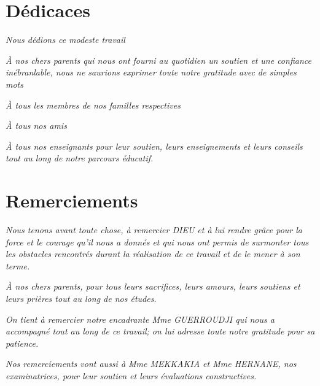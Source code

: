 \documentclass[12pt,a4paper,oneside]{report}
\begin{document}
\cleardoublepage
\thispagestyle{empty}\chapter*{Dédicaces}
\vspace*{3.5cm}
\begin{center}
\large
\textit{Nous dédions ce modeste travail}
\medskip

\textit{À nos chers parents qui nous ont fourni au quotidien un soutien et une confiance inébranlable, nous ne saurions exprimer toute notre gratitude avec de simples mots}
\medskip

\textit{À tous les membres de nos familles respectives}
\medskip

\textit{À tous nos amis}
\medskip

\textit{À tous nos enseignants pour leur soutien, leurs enseignements et leurs conseils tout au long de notre parcours éducatif.}
\end{center}
\vspace{1cm}
\clearpage

\thispagestyle{empty}
\chapter*{Remerciements}
\vspace*{3.5cm}
\begin{center}
\large
    \textit{Nous tenons avant toute chose, à remercier DIEU et à lui rendre grâce pour la force et le courage qu'il nous a donnés et qui nous ont permis de surmonter tous les obstacles rencontrés durant la réalisation de ce travail et de le mener à son terme.}
    
    \medskip
    \textit{À nos chers parents, pour tous leurs sacrifices, leurs amours, leurs soutiens et leurs prières tout au long de nos études.}
    
    \medskip
    \textit{On tient à remercier notre encadrante Mme GUERROUDJI qui nous a accompagné tout au long de ce travail; on lui adresse toute notre gratitude pour sa patience.}
    
    \medskip
    \textit{Nos remerciements vont aussi à Mme MEKKAKIA et Mme HERNANE, nos examinatrices, pour leur soutien et leurs évaluations constructives.}
\end{center}
\clearpage
{}
\tableofcontents
\clearpage
\listoffigures
\clearpage
\listoftables
\clearpage
\end{document}
